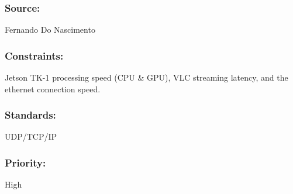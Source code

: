 \subsubsection{Source:} 
	{Fernando Do Nascimento}
\subsubsection{Constraints:} 
	{Jetson TK-1 processing speed (CPU \& GPU), VLC streaming latency, and the ethernet connection speed.}
\subsubsection{Standards:} 
	{UDP/TCP/IP}
\subsubsection{Priority:} 
	{High}
